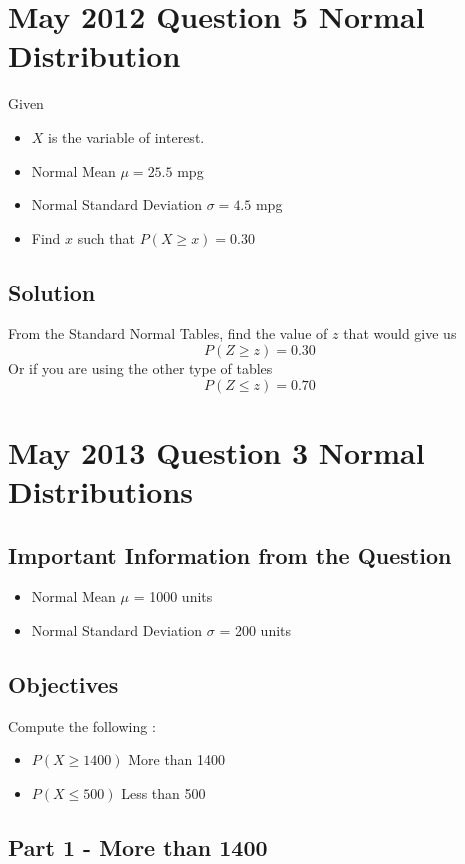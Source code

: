 \documentclass[a4paper,12pt]{article}
\begin{document}
\section*{May 2012 Question 5 Normal Distribution }
Given
\begin{itemize}
\item $X$ is the variable of interest.
\item Normal Mean $\mu =25.5$ mpg
\item Normal Standard Deviation $\sigma =4.5$ mpg
\end{itemize}
\begin{itemize}
\item Find $x$ such that $P(X \geq x) = 0.30$
\end{itemize}
\subsection*{Solution}

From the Standard Normal Tables, find the value of $z$ that would give us
\[ P(Z \geq z) = 0.30 \]
Or if you are using the other type of tables 
\[ P(Z \leq z) = 0.70  \]
\newpage

\section*{May 2013 Question 3 Normal Distributions}

\subsection*{Important Information from the Question}
\begin{itemize}
\item Normal Mean $\mu$ = 1000 units
\item Normal Standard Deviation $\sigma$ = 200 units 
\end{itemize}

\subsection*{Objectives}
Compute the following : 
\begin{itemize}
\item $P(X \geq 1400 )$ More than 1400
\item $P(X \leq 500)$ Less than 500
\end{itemize}


\subsection*{Part 1 -  More than 1400}
\end{document}
